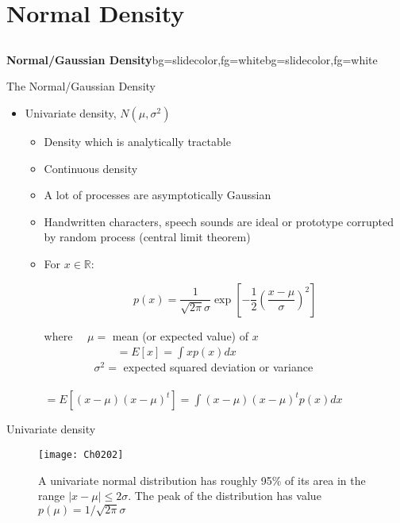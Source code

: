 \section{Normal Density}
\subsection{}
\begin{frame}{}
\begin{variableblock}{\centering \Large \textbf{\vspace{4pt}\newline Normal/Gaussian Density\vspace{4pt}}}{bg=slidecolor,fg=white}{bg=slidecolor,fg=white}
\end{variableblock}
\end{frame}

\begin{frame}{The Normal/Gaussian Density}
\begin{itemize}
\item Univariate density, $N(\mu,\sigma^2)$
\begin{itemize}
\item Density which is analytically tractable
\item Continuous density
\item A lot of processes are asymptotically Gaussian
\item Handwritten characters, speech sounds are ideal or prototype corrupted by random process (central limit theorem)
\item For ${x}\in \mathbb{R}$:

\[\boxed{p(x)=\frac{1}{\sqrt{2\pi}\sigma}\exp\left[-\frac{1}{2}\left(\frac{x-\mu}{\sigma}\right)^2\right]}\]

where ~~$\mu =$ mean (or expected value) of $x$\\
~~~~~~~~~~~~~$= E[{x}]=\int {x}p({x})d{x} $\\
~~~~~~~~~$\sigma^2 = $ expected squared deviation or variance \\

~~~~~~~~~~~~~$ = E[({x}-\mu)({x}-\mu)^t]=\int {({x}-\mu)({x}-\mu)^t}p({x})d{x} $
\end{itemize}
\end{itemize}
\end{frame}

\begin{frame}{Univariate density}
\begin{figure}
\texttt{[image: Ch0202]}
\caption{A univariate normal distribution has roughly 95\% of its area in the range $|x-\mu|\leq 2\sigma$. The peak of the distribution has value $p(\mu)=1/\sqrt{2\pi}\sigma$}
\end{figure}
\end{frame}

